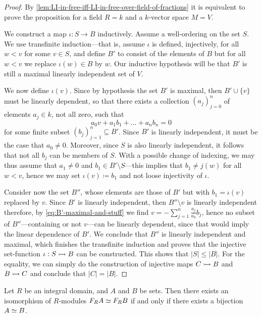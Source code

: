 \begin{proof}
By \cref{lem:LI-in-free-iff-LI-in-free-over-field-of-fractions} it is equivalent
to prove the proposition for a field \(R = k\) and a \(k\)-vector space
\(M = V\).

We construct a map \(\iota: S \to B\) inductively. Assume a well-ordering on the
set \(S\). We use transfinite induction---that is, assume \(\iota\) is defined,
injectively, for all \(w < v\) for some \(v \in S\), and define \(B'\) to
consist of the elements of \(B\) but for all \(w < v\) we replace
\(\iota(w) \in B\) by \(w\). Our inductive hypothesis will be that \(B'\) is
still a maximal linearly independent set of \(V\).

We now define \(\iota(v)\). Since by hypothesis the set \(B'\) is maximal, then
\(B' \cup \{v\}\) must be linearly dependent, so that there exists a collection
\((a_{j})_{j=0}^n\) of elements \(a_j \in k\), not all zero, such that
\begin{equation}\label{eq:B'-maximal-and-stuff}
a_0 v + a_1 b_1 + \dots + a_n b_n = 0
\end{equation}
for some finite subset \((b_j)_{j=1}^n \subseteq B'\). Since \(B'\) is linearly
independent, it must be the case that \(a_0 \neq 0\). Moreover, since \(S\) is
also linearly independent, it follows that not all \(b_j\) can be members of
\(S\). With a possible change of indexing, we may thus assume that
\(a_1 \neq 0\) and \(b_1 \in B' \setminus S\)---this implies that
\(b_1 \neq j(w)\) for all \(w < v\), hence we may set \(\iota(v) \coloneq b_1\)
and not loose injectivity of \(\iota\).

Consider now the set \(B''\), whose elements are those of \(B'\) but with
\(b_1 = \iota(v)\) replaced by \(v\). Since \(B'\) is linearly independent, then
\(B'' \setminus v\) is linearly independent therefore, by
\cref{eq:B'-maximal-and-stuff} we find \(v = -\sum_{j=1}^n \frac{a_j}{a_0}
b_j\), hence no subset of \(B''\)---containing or not \(v\)---can be linearly
dependent, since that would imply the linear dependence of \(B'\). We conclude
that \(B''\) is linearly independent and maximal, which finishes the transfinite
induction and proves that the injective set-function \(\iota: S \rightarrowtail B\) can be
constructed. This shows that \(|S| \leq |B|\). For the equality, we can simply
do the construction of injective maps \(C \rightarrowtail B\) and \(B \rightarrowtail C\) and
conclude that \(|C| = |B|\).
\end{proof}

\begin{corollary}
\label{cor:integral-domain-satisfies-IBN}
Let \(R\) be an integral domain, and \(A\) and \(B\) be sets. Then there exists
an isomorphism of \(R\)-modules \(F_R A \simeq F_R B\) if and only if there exists
a bijection \(A \simeq B\).
\end{corollary}

